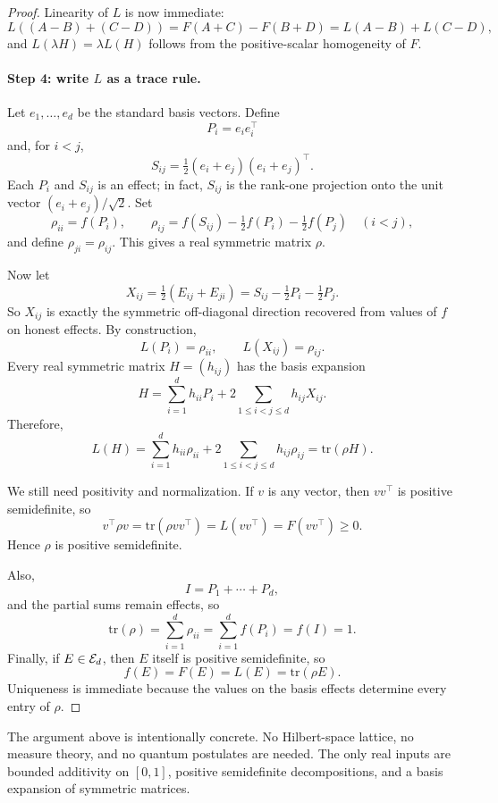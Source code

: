 \begin{proof}
Linearity of $L$ is now immediate:
\[
L((A-B)+(C-D))=F(A+C)-F(B+D)=L(A-B)+L(C-D),
\]
and $L(\lambda H)=\lambda L(H)$ follows from the positive-scalar homogeneity of $F$.

\paragraph{Step 4: write $L$ as a trace rule.}
Let $e_1,\dots,e_d$ be the standard basis vectors. Define
\[
P_i=e_i e_i^\top
\]
and, for $i<j$,
\[
S_{ij}=\tfrac12(e_i+e_j)(e_i+e_j)^\top.
\]
Each $P_i$ and $S_{ij}$ is an effect; in fact, $S_{ij}$ is the rank-one projection onto the unit vector $(e_i+e_j)/\sqrt2$. Set
\[
\rho_{ii}=f(P_i),\qquad
\rho_{ij}=f(S_{ij})-\tfrac12 f(P_i)-\tfrac12 f(P_j)\quad (i<j),
\]
and define $\rho_{ji}=\rho_{ij}$. This gives a real symmetric matrix $\rho$.

Now let
\[
X_{ij}=\tfrac12(E_{ij}+E_{ji})=S_{ij}-\tfrac12 P_i-\tfrac12 P_j.
\]
So $X_{ij}$ is exactly the symmetric off-diagonal direction recovered from values of $f$ on honest effects.
By construction,
\[
L(P_i)=\rho_{ii},\qquad L(X_{ij})=\rho_{ij}.
\]
Every real symmetric matrix $H=(h_{ij})$ has the basis expansion
\[
H=\sum_{i=1}^d h_{ii}P_i+2\sum_{1\le i<j\le d} h_{ij}X_{ij}.
\]
Therefore,
\[
L(H)=\sum_{i=1}^d h_{ii}\rho_{ii}+2\sum_{1\le i<j\le d} h_{ij}\rho_{ij}
=\mathrm{tr}(\rho H).
\]

We still need positivity and normalization. If $v$ is any vector, then $vv^\top$ is positive semidefinite, so
\[
v^\top \rho v=\mathrm{tr}(\rho vv^\top)=L(vv^\top)=F(vv^\top)\ge 0.
\]
Hence $\rho$ is positive semidefinite.

Also,
\[
I=P_1+\cdots+P_d,
\]
and the partial sums remain effects, so
\[
\mathrm{tr}(\rho)=\sum_{i=1}^d \rho_{ii}
=\sum_{i=1}^d f(P_i)=f(I)=1.
\]
Finally, if $E\in\mathcal{E}_d$, then $E$ itself is positive semidefinite, so
\[
f(E)=F(E)=L(E)=\mathrm{tr}(\rho E).
\]
Uniqueness is immediate because the values on the basis effects determine every entry of $\rho$.
\end{proof}

The argument above is intentionally concrete. No Hilbert-space lattice, no measure theory, and no quantum postulates are needed. The only real inputs are bounded additivity on $[0,1]$, positive semidefinite decompositions, and a basis expansion of symmetric matrices.
